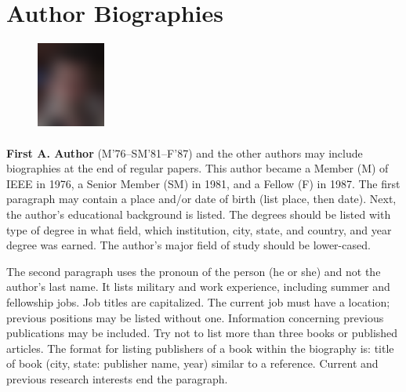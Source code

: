 \documentclass[9pt,twocolumn,twoside]{osajnl}
\begin{document}







 \section*{Author Biographies}

\setlength\intextsep{0pt}

\begin{figure}
\includegraphics[width=0.20\textwidth]{johnsmith}
\end{figure}
\paragraph{}
\noindent \textbf{First A. Author} (M’76–SM’81–F’87) and the other authors may include biographies at the end of regular papers. This author became a Member (M) of IEEE in 1976, a Senior Member (SM) in 1981, and a Fellow (F) in 1987. The first paragraph may contain a place and/or date of birth (list place, then date). Next, the author’s educational background is listed. The degrees should be listed with type of degree in what field, which institution, city, state, and country, and year degree was earned. The author’s major field of study should be lower-cased.
  
The second paragraph uses the pronoun of the person (he or she) and not the author’s last name. It lists military and work experience, including summer and fellowship jobs. Job titles are capitalized. The current job must have a location; previous positions may be listed without one. Information concerning previous publications may be included. Try not to list more than three books or published articles. The format for listing publishers of a book within the biography is: title of book (city, state: publisher name, year) similar to a reference. Current and previous research interests end the paragraph.
\end{document}

